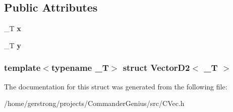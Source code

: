 \subsection*{Public Attributes}
\begin{DoxyCompactItemize}
\item 
\hypertarget{struct_vector_d2_afb33da249f2f63172d90812734a9565b}{
\_\-T {\bfseries x}}
\label{struct_vector_d2_afb33da249f2f63172d90812734a9565b}

\item 
\hypertarget{struct_vector_d2_ac0bb2a41a27d413c79db36c51166b180}{
\_\-T {\bfseries y}}
\label{struct_vector_d2_ac0bb2a41a27d413c79db36c51166b180}

\end{DoxyCompactItemize}
\subsubsection*{template$<$typename \_\-T$>$ struct VectorD2$<$ \_\-T $>$}



The documentation for this struct was generated from the following file:\begin{DoxyCompactItemize}
\item 
/home/gerstrong/projects/CommanderGenius/src/CVec.h\end{DoxyCompactItemize}
